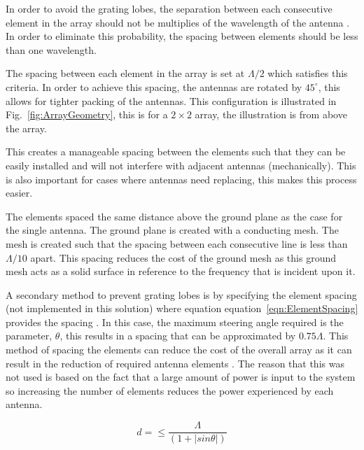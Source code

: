 \documentclass[11pt]{witseiepaper}
\begin{document}
In order to avoid the grating lobes, the separation between each consecutive element in the array should not be multiplies of the wavelength of the antenna \cite[p.~297]{Balanis}.
In order to eliminate this probability, the spacing between elements should be less than one wavelength.



The spacing between each element in the array is set at $\Lambda/2$ which satisfies this criteria.
In order to achieve this spacing, the antennas are rotated by $45^{\circ}$, this allows for tighter packing of the antennas. This configuration is illustrated in Fig.~\ref{fig:ArrayGeometry}, this is for a $2 \times 2$ array, the illustration is from above the array.



This creates a manageable spacing between the elements such that they can be easily installed and will not interfere with adjacent antennas (mechanically). This is also important for cases where antennas need replacing, this makes this process easier.

The elements spaced the same distance above the ground plane as the case for the single antenna. The ground plane is created with a conducting mesh. The mesh is created such that the spacing between each consecutive line is less than $\Lambda/10$ apart. This spacing reduces the cost of the ground mesh as this ground mesh acts as a solid surface in reference to the frequency that is incident upon it.

A secondary method to prevent grating lobes is by specifying the element spacing (not implemented in this solution) where equation equation~\ref{eqn:ElementSpacing} provides the spacing \cite[p.~331]{radarHandbook}. In this case, the maximum steering angle required is the parameter, $\theta$, this results in a spacing that can be approximated by $0.75 \Lambda$. 
This method of spacing the elements can reduce the cost of the overall array as it can result in the reduction of required antenna elements \cite[p.~331]{radarHandbook}.
The reason that this was not used is based on the fact that a large amount of power is input to the system so increasing the number of elements reduces the power experienced by each antenna.

\begin{equation} \label{eqn:ElementSpacing}
d = \leq \frac{\Lambda}{(1 + | sin \theta |)}
\end{equation}
\end{document}
